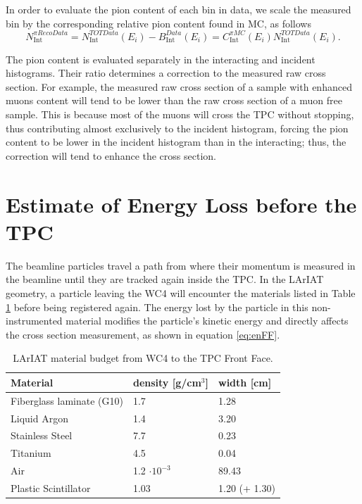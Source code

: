 In order to evaluate the pion content of each bin in data, we scale the measured bin by the corresponding relative pion content found in MC, as follows
\begin{equation}
N^{\pi Reco Data}_{\text{Int}} = N^{TOT Data}_{\text{Int}} (E_{i}) - B^{Data}_{\text{Int}} (E_i)  =  C^{\pi MC}_{\text{Int}} (E_{i}) N^{TOT Data}_{\text{Int}} (E_{i}).
\end{equation}

The pion content is evaluated separately in the interacting and incident histograms. Their ratio determines a correction to the measured raw cross section. 
For example, the measured raw  cross section of a sample with enhanced muons content will tend to be lower than the raw cross section of a muon free sample. This is because most of the muons will cross the TPC without stopping, thus contributing almost exclusively to the incident histogram, forcing the pion content to be lower in the incident histogram than in the interacting; thus, the correction will tend to enhance the cross section.

\section{Estimate of Energy Loss before the TPC}\label{ch:eloss}
The beamline particles travel a path from where their  momentum is measured in the beamline until they are tracked again inside the TPC. In the LArIAT geometry, a particle leaving the WC4 will encounter the materials listed in Table \ref{tab:budget} before being registered again. The energy lost by the particle in this non-instrumented material modifies the particle's kinetic energy and directly affects the cross section measurement, as shown in equation \ref{eq:enFF}.

\begin{table}[h!]
\centering
\begin{tabular}{|l|l|l|}
\hline
Material  & density {[}g/cm$^3${]} & width {[}cm{]}    \\ \hline
Fiberglass laminate (G10)      & 1.7                             & 1.28                              \\
Liquid Argon                           & 1.4                             & 3.20                             \\
Stainless Steel                        & 7.7                            & 0.23                             \\
Titanium                                  & 4.5                            & 0.04                             \\ 
Air                                            &  1.2 $\cdot10^{-3}$  & 89.43                              \\
Plastic Scintillator                    & 1.03                          & 1.20 (+ 1.30)                 \\ \hline
\end{tabular}
\caption{LArIAT material budget from WC4 to the TPC Front Face.}
\label{tab:budget}
\end{table}


